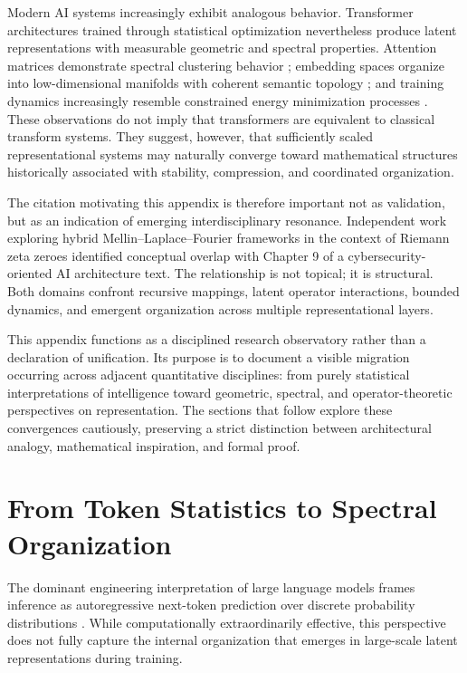 Modern AI systems increasingly exhibit analogous behavior. Transformer architectures trained through statistical optimization nevertheless produce latent representations with measurable geometric and spectral properties. Attention matrices demonstrate spectral clustering behavior \cite{gabbay2021spectral}; embedding spaces organize into low-dimensional manifolds with coherent semantic topology \cite{park2024geometry}; and training dynamics increasingly resemble constrained energy minimization processes \cite{lecun2022path}. These observations do not imply that transformers are equivalent to classical transform systems. They suggest, however, that sufficiently scaled representational systems may naturally converge toward mathematical structures historically associated with stability, compression, and coordinated organization.

The citation motivating this appendix \cite{irwin2026mlf} is therefore important not as validation, but as an indication of emerging interdisciplinary resonance. Independent work exploring hybrid Mellin--Laplace--Fourier frameworks in the context of Riemann zeta zeroes identified conceptual overlap with Chapter 9 of a cybersecurity-oriented AI architecture text. The relationship is not topical; it is structural. Both domains confront recursive mappings, latent operator interactions, bounded dynamics, and emergent organization across multiple representational layers.

This appendix functions as a disciplined research observatory rather than a declaration of unification. Its purpose is to document a visible migration occurring across adjacent quantitative disciplines: from purely statistical interpretations of intelligence toward geometric, spectral, and operator-theoretic perspectives on representation. The sections that follow explore these convergences cautiously, preserving a strict distinction between architectural analogy, mathematical inspiration, and formal proof.

\clearpage
{} %
\section{From Token Statistics to Spectral Organization}
\label{appx:token-spectral}

The dominant engineering interpretation of large language models frames inference as autoregressive next-token prediction over discrete probability distributions \cite{Vaswani2017}. While computationally extraordinarily effective, this perspective does not fully capture the internal organization that emerges in large-scale latent representations during training.

